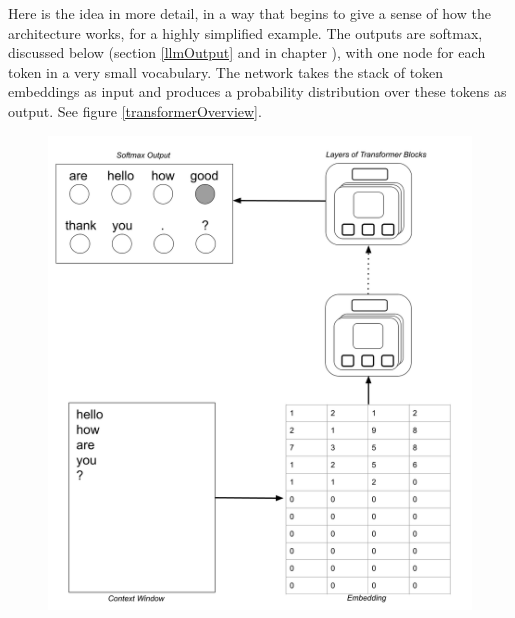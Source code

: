 Here is the idea in more detail, in a way that begins to give a sense of how the architecture works, for a highly simplified example. The outputs are softmax, discussed below (section \ref{llmOutput} and in chapter ), with one node for each token in a very small vocabulary. The network takes the stack of token embeddings as input and produces a probability distribution over these tokens as output.  See figure \ref{transformerOverview}.

\begin{figure}[h]
\centering
\includegraphics[scale=.2]{./images/TransformerOverview.png} \; \; \; 

\end{figure}
